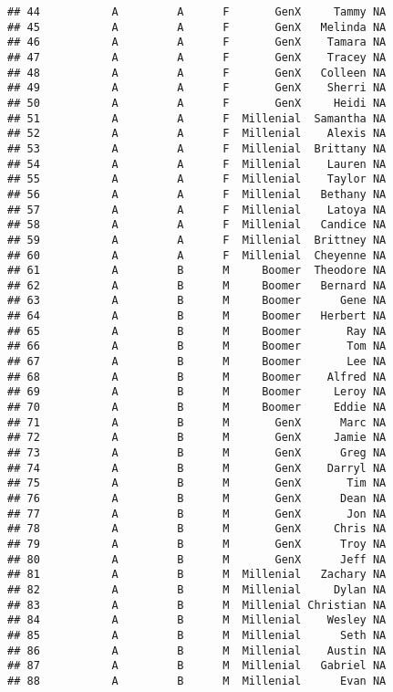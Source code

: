 \documentclass[
]{article}
\begin{document}
\begin{verbatim}
## 44           A         A      F       GenX     Tammy NA
## 45           A         A      F       GenX   Melinda NA
## 46           A         A      F       GenX    Tamara NA
## 47           A         A      F       GenX    Tracey NA
## 48           A         A      F       GenX   Colleen NA
## 49           A         A      F       GenX    Sherri NA
## 50           A         A      F       GenX     Heidi NA
## 51           A         A      F  Millenial  Samantha NA
## 52           A         A      F  Millenial    Alexis NA
## 53           A         A      F  Millenial  Brittany NA
## 54           A         A      F  Millenial    Lauren NA
## 55           A         A      F  Millenial    Taylor NA
## 56           A         A      F  Millenial   Bethany NA
## 57           A         A      F  Millenial    Latoya NA
## 58           A         A      F  Millenial   Candice NA
## 59           A         A      F  Millenial  Brittney NA
## 60           A         A      F  Millenial  Cheyenne NA
## 61           A         B      M     Boomer  Theodore NA
## 62           A         B      M     Boomer   Bernard NA
## 63           A         B      M     Boomer      Gene NA
## 64           A         B      M     Boomer   Herbert NA
## 65           A         B      M     Boomer       Ray NA
## 66           A         B      M     Boomer       Tom NA
## 67           A         B      M     Boomer       Lee NA
## 68           A         B      M     Boomer    Alfred NA
## 69           A         B      M     Boomer     Leroy NA
## 70           A         B      M     Boomer     Eddie NA
## 71           A         B      M       GenX      Marc NA
## 72           A         B      M       GenX     Jamie NA
## 73           A         B      M       GenX      Greg NA
## 74           A         B      M       GenX    Darryl NA
## 75           A         B      M       GenX       Tim NA
## 76           A         B      M       GenX      Dean NA
## 77           A         B      M       GenX       Jon NA
## 78           A         B      M       GenX     Chris NA
## 79           A         B      M       GenX      Troy NA
## 80           A         B      M       GenX      Jeff NA
## 81           A         B      M  Millenial   Zachary NA
## 82           A         B      M  Millenial     Dylan NA
## 83           A         B      M  Millenial Christian NA
## 84           A         B      M  Millenial    Wesley NA
## 85           A         B      M  Millenial      Seth NA
## 86           A         B      M  Millenial    Austin NA
## 87           A         B      M  Millenial   Gabriel NA
## 88           A         B      M  Millenial      Evan NA

\end{verbatim}
\end{document}
